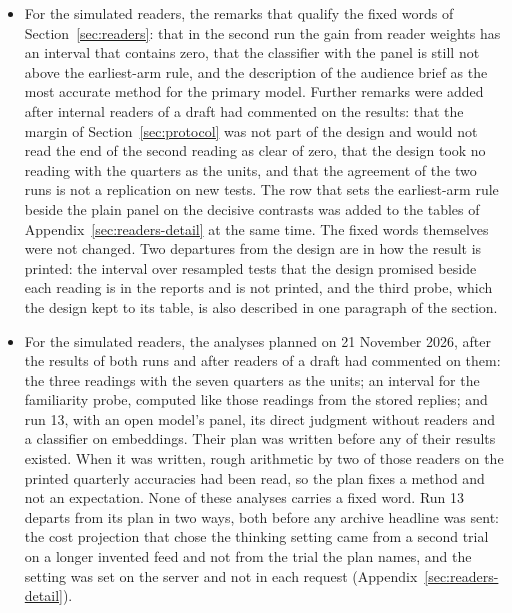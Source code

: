 \begin{itemize}
\item For the simulated readers, the remarks that qualify the fixed words of Section~\ref{sec:readers}: that in the second run the gain from reader weights has an interval that contains zero, that the classifier with the panel is still not above the earliest-arm rule, and the description of the audience brief as the most accurate method for the primary model. Further remarks were added after internal readers of a draft had commented on the results: that the margin of Section~\ref{sec:protocol} was not part of the design and would not read the end of the second reading as clear of zero, that the design took no reading with the quarters as the units, and that the agreement of the two runs is not a replication on new tests. The row that sets the earliest-arm rule beside the plain panel on the decisive contrasts was added to the tables of Appendix~\ref{sec:readers-detail} at the same time. The fixed words themselves were not changed. Two departures from the design are in how the result is printed: the interval over resampled tests that the design promised beside each reading is in the reports and is not printed, and the third probe, which the design kept to its table, is also described in one paragraph of the section.
\item For the simulated readers, the analyses planned on 21 November 2026, after the results of both runs and after readers of a draft had commented on them: the three readings with the seven quarters as the units; an interval for the familiarity probe, computed like those readings from the stored replies; and run 13, with an open model's panel, its direct judgment without readers and a classifier on embeddings. Their plan was written before any of their results existed. When it was written, rough arithmetic by two of those readers on the printed quarterly accuracies had been read, so the plan fixes a method and not an expectation. None of these analyses carries a fixed word. Run 13 departs from its plan in two ways, both before any archive headline was sent: the cost projection that chose the thinking setting came from a second trial on a longer invented feed and not from the trial the plan names, and the setting was set on the server and not in each request (Appendix~\ref{sec:readers-detail}).
\end{itemize}
